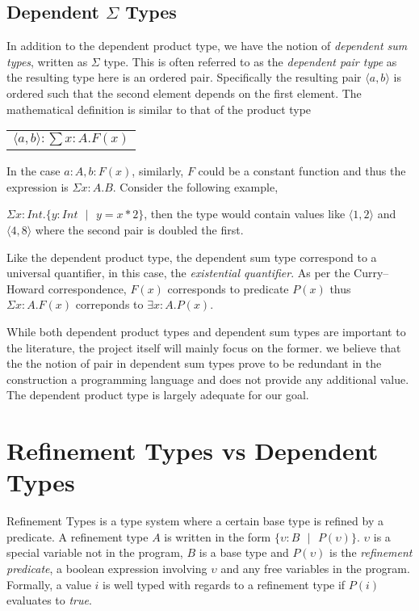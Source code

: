 \documentclass[a4paper,12pt]{report}
\begin{document}
\subsection{Dependent $\Sigma$ Types}
In addition to the dependent product type, we have the notion of \textit{dependent sum 
types}, written as $\Sigma$ type. This is often referred to as the 
\textit{dependent pair type} as the resulting type here is an ordered pair. 
Specifically the resulting pair $\langle a,b \rangle$ is ordered such that the 
second element depends on the first element. The 
mathematical definition is similar to that of the product type
\begin{center}
 \begin{tabular}{l}
   $\langle a,b \rangle :\sum x: A.  F(x)$
 \end{tabular} 
\end{center}
In the case $a:A, b: F(x)$, similarly, $F$ could be a constant function and thus 
the expression is $\Sigma x:A.B$. Consider the following example, 

$\Sigma x: Int.\{y:Int\text{ }|\text{ } y = x * 2\}$, then the type would 
contain values like $\langle 1,2 \rangle$ and $\langle 4,8 \rangle$ where the 
second pair is doubled the first.

\par
Like the dependent product type, the dependent sum type correspond to a 
universal quantifier, in this case, the \textit{existential quantifier}. As 
per the Curry–Howard correspondence, $F(x)$ corresponds to predicate $P(x)$ 
thus $\Sigma x:A.F(x)$ correponds to $\exists x: A. P(x)$.

\par
While both dependent product types and dependent sum types are important to the 
literature, the project itself will mainly focus on the former. we believe that 
the the notion of pair in dependent sum types prove to be redundant in 
the construction a programming language and does not provide any additional 
value. The dependent product type is largely adequate for our goal.

\section{Refinement Types vs Dependent Types}
Refinement Types is a type system where a certain base type is refined by a 
predicate. A refinement type $A$ is written in the form 
$\{\upsilon : B\text{ }|\text{ }P(\upsilon)\}$. $\upsilon$ is a special variable 
not in the program, $B$ is a base type and $P(\upsilon)$ is the 
\textit{refinement predicate}, a boolean expression 
involving $\upsilon$ and any free variables in the program. Formally, a value 
$i$ is well typed with regards to a refinement type if $P(i)$ evaluates to 
\textit{true}.
\end{document}
